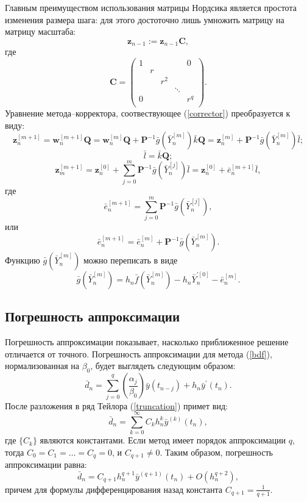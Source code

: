 \documentclass[oneside,final,14pt]{extreport}
\begin{document}
Главным преимуществом использования матрицы Нордсика является простота изменения размера шага: для этого достоточно лишь умножить матрицу на матрицу масштаба:
\[\mathbf z_{n-1}:=\mathbf z_{n-1} \mathbf C,\]
где
\[\mathbf C=
\begin{pmatrix}
	1 &   & & & 0\\
	  & r & & &\\
	  &   & r^2 & &\\
	  &   &  & \ddots &\\
	0 &   &  &  & r^q\\
\end{pmatrix}.
\]
Уравнение метода--корректора, соотвествующее (\ref{corrector}) преобразуется к виду:
\[
\mathbf z_n^{[m+1]}=\mathbf w_n^{[m+1]}\mathbf Q=\mathbf w_n^{[m]}\mathbf Q+\mathbf P^{-1}\bar g(\bar Y_n^{[m]})\bar k\mathbf Q=\mathbf z_{n}^{[m]}+\mathbf P^{-1}\bar g(\bar Y_n^{[m]})\bar l;
\]
\[
\bar l=\bar k\mathbf Q;
\]
\begin{equation}
\label{nordseick:iteration}
\mathbf z_m^{[m+1]}=\mathbf z_n^{[0]}+\sum_{j=0}^m\mathbf P^{-1}\bar g(\bar Y_n^{[j]})\bar l=\mathbf z_n^{[0]}+\bar e_n^{[m+1]}\bar l
,\end{equation}
где
\[\bar e_n^{[m+1]}=\sum_{j=0}^m\mathbf P^{-1}\bar g(\bar Y_n^{[j]}),\]
или
\[\bar e_n^{[m+1]}=\bar e_n^{[m]}+\mathbf P^{-1}\bar g(\bar Y_n^{[m]}).\]
Функцию \(\bar g(\bar Y_n^{[m]})\) можно переписать в виде
\[\bar g(\bar Y_n^{[m]})=h_n\bar f(\bar Y_n^{[m]})-h_n\bar Y_n^{'[0]}-\bar e_n^{[m]}.\]

\subsection{Погрешность аппроксимации}

Погрешность аппроксимации показывает, насколько приближенное решение отличается от точного. Погрешность аппроксимации для метода (\ref{bdf}), нормализованная на \(\beta_0\), будет выглядеть следующим образом:
\begin{equation}
\label{truncation}
\bar d_n=\sum_{j=0}^q\left(\frac{\alpha_j}{\beta_0}\right)\bar y(t_{n-j})+h_n\bar y^{'}(t_n).
\end{equation}
После разложения в ряд Тейлора  (\ref{truncation}) примет вид:
\[
\bar d_n=\sum_{k=0}^{\infty}C_k h_n^k \bar y^{(k)}(t_n),
\]
	где \(\{C_k\}\) являются константами. Если метод имеет порядок аппроксимации \(q\), тогда \(C_0=C_1=\ldots=C_q=0\), и \(C_{q+1}\neq0\). Таким образом, погрешность аппроксимации равна:
\[
\bar d_n=C_{q+1} h_n^{q+1} \bar y^{(q+1)}(t_n)+O(h_n^{q+2}),
\]
причем для формулы дифференцирования назад константа \(C_{q+1}=\frac{1}{q+1}.\)
\end{document}
